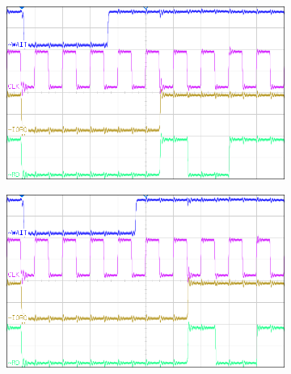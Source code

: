 \documentclass[fleqn]{article}
\begin{document}
\begin{figure}[H]
\begin{subfigure}[b]{0.49\textwidth}
		\caption{}
	\end{subfigure}
	\begin{subfigure}[b]{0.49\textwidth}
		\includegraphics[width=\textwidth]{img/2d.png}
		\caption{}
	\end{subfigure}
	\begin{subfigure}[b]{0.49\textwidth}
		\includegraphics[width=\textwidth]{img/2e.png}
		\caption{}
	\end{subfigure}
	\caption{}
\end{figure}
\end{document}
